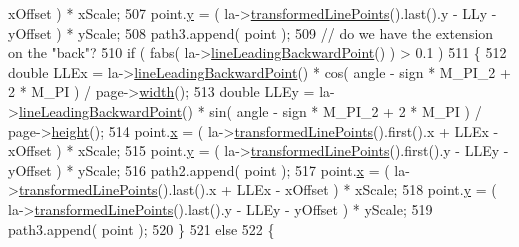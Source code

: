 \begin{DoxyCode}
      xOffset ) * xScale;
507                         point.\hyperlink{classOkular_1_1NormalizedPoint_ac2276daabda627d5f82bb1532c293047}{y} = ( la->\hyperlink{classOkular_1_1LineAnnotation_a1e3b104d9572967e66f35a15c335f37c}{transformedLinePoints}().last().y - LLy - 
      yOffset ) * yScale;
508                         path3.append( point );
509                         \textcolor{comment}{// do we have the extension on the "back"?}
510                         \textcolor{keywordflow}{if} ( fabs( la->\hyperlink{classOkular_1_1LineAnnotation_a6a492d6aadd6d9ee879f85c5f24e99a0}{lineLeadingBackwardPoint}() ) > 0.1 )
511                         \{
512                             \textcolor{keywordtype}{double} LLEx = la->\hyperlink{classOkular_1_1LineAnnotation_a6a492d6aadd6d9ee879f85c5f24e99a0}{lineLeadingBackwardPoint}() * cos( 
      angle - sign * M\_PI\_2 + 2 * M\_PI ) / page->\hyperlink{classOkular_1_1Page_a57114e88281da2a51b1bb0d5d4996d53}{width}();
513                             \textcolor{keywordtype}{double} LLEy = la->\hyperlink{classOkular_1_1LineAnnotation_a6a492d6aadd6d9ee879f85c5f24e99a0}{lineLeadingBackwardPoint}() * sin( 
      angle - sign * M\_PI\_2 + 2 * M\_PI ) / page->\hyperlink{classOkular_1_1Page_a67246a32b3e625946eb5c685b8372a4f}{height}();
514                             point.\hyperlink{classOkular_1_1NormalizedPoint_a857f49b9bc7712430d167472ef9dbd94}{x} = ( la->\hyperlink{classOkular_1_1LineAnnotation_a1e3b104d9572967e66f35a15c335f37c}{transformedLinePoints}().first().x + LLEx 
      - xOffset ) * xScale;
515                             point.\hyperlink{classOkular_1_1NormalizedPoint_ac2276daabda627d5f82bb1532c293047}{y} = ( la->\hyperlink{classOkular_1_1LineAnnotation_a1e3b104d9572967e66f35a15c335f37c}{transformedLinePoints}().first().y - LLEy 
      - yOffset ) * yScale;
516                             path2.append( point );
517                             point.\hyperlink{classOkular_1_1NormalizedPoint_a857f49b9bc7712430d167472ef9dbd94}{x} = ( la->\hyperlink{classOkular_1_1LineAnnotation_a1e3b104d9572967e66f35a15c335f37c}{transformedLinePoints}().last().x + LLEx -
       xOffset ) * xScale;
518                             point.\hyperlink{classOkular_1_1NormalizedPoint_ac2276daabda627d5f82bb1532c293047}{y} = ( la->\hyperlink{classOkular_1_1LineAnnotation_a1e3b104d9572967e66f35a15c335f37c}{transformedLinePoints}().last().y - LLEy -
       yOffset ) * yScale;
519                             path3.append( point );
520                         \}
521                         \textcolor{keywordflow}{else}
522                         \{

\end{DoxyCode}
